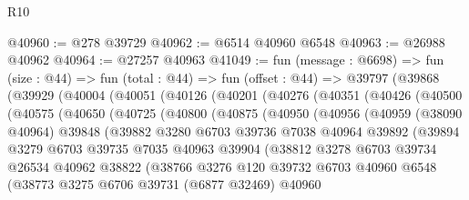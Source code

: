 \begin{lexlean}{R10}
\begin{coremodule}
@40960 := @278 @39729
@40962 := @6514 @40960 @6548
@40963 := @26988 @40962
@40964 := @27257 @40963
@41049 := fun (message : @6698) =>
  fun (size : @44) =>
  fun (total : @44) =>
  fun (offset : @44) =>
  @39797
    (@39868
      (@39929
        (@40004
          (@40051
            (@40126
              (@40201
                (@40276
                  (@40351
                    (@40426
                      (@40500
                        (@40575
                          (@40650
                            (@40725
                              (@40800
                                (@40875
                                  (@40950
                                    (@40956
                                      (@40959
                                        (@38090 @40964)
                                        @39848
                                        (@39882
                                          @3280
                                          @6703
                                          @39736
                                          @7038
                                          @40964
                                          @39892
                                          (@39894
                                            @3279
                                            @6703
                                            @39735
                                            @7035
                                            @40963
                                            @39904
                                            (@38812
                                              @3278
                                              @6703
                                              @39734
                                              @26534
                                              @40962
                                              @38822
                                              (@38766
                                                @3276
                                                @120
                                                @39732
                                                @6703
                                                @40960
                                                @6548
                                                (@38773
                                                  @3275
                                                  @6706
                                                  @39731
                                                  (@6877 @32469)
                                                  @40960

\end{coremodule}
\end{lexlean}
